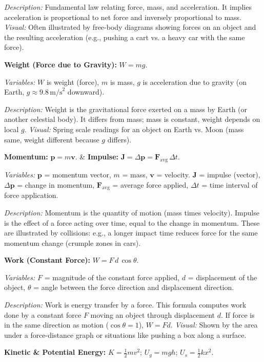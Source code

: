 \documentclass{article}
\begin{document}
\textit{Description:} Fundamental law relating force, mass, and acceleration. It implies acceleration is proportional to net force and inversely proportional to mass. \textit{Visual:} Often illustrated by free-body diagrams showing forces on an object and the resulting acceleration (e.g., pushing a cart vs. a heavy car with the same force).

\textbf{Weight (Force due to Gravity):} $W = m g$.

\textit{Variables:} $W$ is weight (force), $m$ is mass, $g$ is acceleration due to gravity (on Earth, $g \approx 9.8\,\text{m/s}^2$ downward).

\textit{Description:} Weight is the gravitational force exerted on a mass by Earth (or another celestial body). It differs from mass; mass is constant, weight depends on local $g$. \textit{Visual:} Spring scale readings for an object on Earth vs. Moon (mass same, weight different because $g$ differs).

\textbf{Momentum:} $\displaystyle \mathbf{p} = m \mathbf{v}$. \& \textbf{Impulse:} $\mathbf{J} = \Delta \mathbf{p} = \mathbf{F}_{\text{avg}}\,\Delta t$.

\textit{Variables:} $\mathbf{p}$ = momentum vector, $m$ = mass, $\mathbf{v}$ = velocity. $\mathbf{J}$ = impulse (vector), $\Delta \mathbf{p}$ = change in momentum, $\mathbf{F}_{\text{avg}}$ = average force applied, $\Delta t$ = time interval of force application.

\textit{Description:} Momentum is the quantity of motion (mass times velocity). Impulse is the effect of a force acting over time, equal to the change in momentum. These are illustrated by collisions: e.g., a longer impact time reduces force for the same momentum change (crumple zones in cars).

\textbf{Work (Constant Force):} $W = F\,d \,\cos\theta$.

\textit{Variables:} $F$ = magnitude of the constant force applied, $d$ = displacement of the object, $\theta$ = angle between the force direction and displacement direction.

\textit{Description:} Work is energy transfer by a force. This formula computes work done by a constant force $F$ moving an object through displacement $d$. If force is in the same direction as motion ($\cos\theta=1$), $W=Fd$. \textit{Visual:} Shown by the area under a force-distance graph or situations like pushing a box along a surface.

\textbf{Kinetic \& Potential Energy:} $K = \tfrac{1}{2} m v^2$;  $U_g = m g h$;  $U_s = \tfrac{1}{2} k x^2$.
\end{document}

